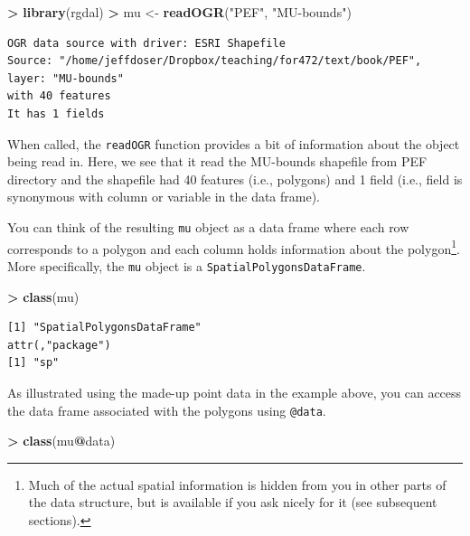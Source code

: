 \documentclass[]{krantz}
\makeatletter
\newenvironment{Shaded}{\begin{snugshade}}{\end{snugshade}}
\newcommand{\KeywordTok}[1]{\textcolor[rgb]{0.27,0.27,0.27}{\textbf{#1}}}
\newcommand{\NormalTok}[1]{#1}
\newcommand{\OperatorTok}[1]{\textcolor[rgb]{0.43,0.43,0.43}{\textbf{#1}}}
\newcommand{\StringTok}[1]{\textcolor[rgb]{0.5,0.5,0.5}{#1}}
\newenvironment{kframe}{%
\medskip{}
\setlength{\fboxsep}{.8em}
 \def\at@end@of@kframe{}%
 \ifinner\ifhmode%
  \def\at@end@of@kframe{\end{minipage}}%
  \begin{minipage}{\columnwidth}%
 \fi\fi%
 \def\FrameCommand##1{\hskip\@totalleftmargin \hskip-\fboxsep
 \colorbox{shadecolor}{##1}\hskip-\fboxsep
     \hskip-\linewidth \hskip-\@totalleftmargin \hskip\columnwidth}%
 \MakeFramed {\advance\hsize-\width
   \@totalleftmargin\z@ \linewidth\hsize
   \@setminipage}}%
 {\par\unskip\endMakeFramed%
 \at@end@of@kframe}
\renewenvironment{Shaded}{\begin{kframe}}{\end{kframe}}
\makeatother
\begin{document}
\begin{Shaded}
\begin{Highlighting}[]
\OperatorTok{>}\StringTok{ }\KeywordTok{library}\NormalTok{(rgdal)}
\OperatorTok{>}\StringTok{ }\NormalTok{mu <-}\StringTok{ }\KeywordTok{readOGR}\NormalTok{(}\StringTok{"PEF"}\NormalTok{, }\StringTok{"MU-bounds"}\NormalTok{)}
\end{Highlighting}
\end{Shaded}

\begin{verbatim}
OGR data source with driver: ESRI Shapefile 
Source: "/home/jeffdoser/Dropbox/teaching/for472/text/book/PEF", layer: "MU-bounds"
with 40 features
It has 1 fields
\end{verbatim}

When called, the \texttt{readOGR} function provides a bit of information about the object being read in. Here, we see that it read the MU-bounds shapefile from PEF directory and the shapefile had 40 features (i.e., polygons) and 1 field (i.e., field is synonymous with column or variable in the data frame).

You can think of the resulting \texttt{mu} object as a data frame where each row corresponds to a polygon and each column holds information about the polygon\footnote{Much of the actual spatial information is hidden from you in other parts of the data structure, but is available if you ask nicely for it (see subsequent sections).}. More specifically, the \texttt{mu} object is a \texttt{SpatialPolygonsDataFrame}.

\begin{Shaded}
\begin{Highlighting}[]
\OperatorTok{>}\StringTok{ }\KeywordTok{class}\NormalTok{(mu)}
\end{Highlighting}
\end{Shaded}

\begin{verbatim}
[1] "SpatialPolygonsDataFrame"
attr(,"package")
[1] "sp"
\end{verbatim}

As illustrated using the made-up point data in the example above, you can access the data frame associated with the polygons using \texttt{@data}.

\begin{Shaded}
\begin{Highlighting}[]
\OperatorTok{>}\StringTok{ }\KeywordTok{class}\NormalTok{(mu}\OperatorTok{@}\NormalTok{data)}
\end{Highlighting}
\end{Shaded}
\end{document}
